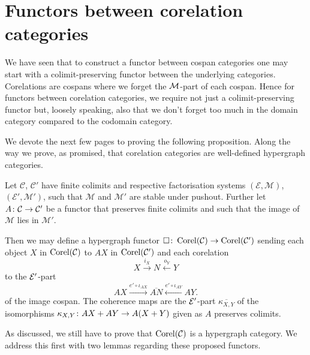 \section{Functors between corelation categories} \label{sec.corelfunctors}
We have seen that to construct a functor between cospan categories one may start
with a colimit-preserving functor between the underlying categories. Corelations
are cospans where we forget the $\mathcal M$-part of each cospan. Hence for functors
between corelation categories, we require not just a colimit-preserving functor
but, loosely speaking, also that we don't forget too much in the domain category
compared to the codomain category.

We devote the next few pages to proving the following proposition. Along the way
we prove, as promised, that corelation categories are well-defined hypergraph
categories.

\begin{proposition} \label{prop.corelfunctors}
  Let $\mathcal C$, $\mathcal C'$ have finite colimits and respective
  factorisation systems $(\mathcal E, \mathcal M)$, $(\mathcal E', \mathcal M')$,
  such that $\mathcal M$ and $\mathcal M'$ are stable under pushout. Further let
  $A{\colon} \mathcal C \to \mathcal C'$ be a functor that preserves finite colimits
  and such that the image of $\mathcal M$ lies in $\mathcal M'$.

  Then we may define a hypergraph functor $\square{\colon} \operatorname{{Corel}}(\mathcal C) \to
  \operatorname{{Corel}}(\mathcal C')$ sending each object $X$ in $\operatorname{{Corel}}(\mathcal C)$ to $AX$ in
  $\operatorname{{Corel}}(\mathcal C')$ and each corelation 
  \[
    X \stackrel{i_X}{\longrightarrow} N \stackrel{o_Y}{\longleftarrow} Y 
  \]
  to the $\mathcal E'$-part
  \[
    AX \xrightarrow{e'\circ\iota_{AX}} \overline{AN}
    \xleftarrow{e'\circ\iota_{AY}} AY.
  \]
  of the image cospan. The coherence maps are the $\mathcal E'$-part
  $\overline{\kappa_{X,Y}}$ of the isomorphisms $\kappa_{X,Y}{\colon} AX+AY \to
  A(X+Y)$ given as $A$ preserves colimits.
\end{proposition}

As discussed, we still have to prove that $\operatorname{{Corel}}(\mathcal C)$ is a hypergraph
category. We address this first with two lemmas regarding these proposed
functors.

